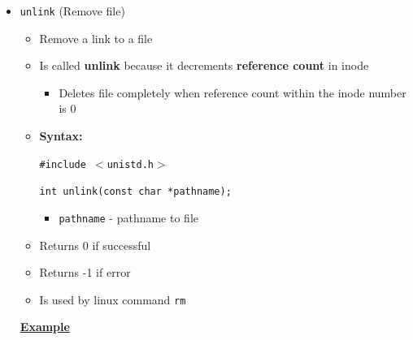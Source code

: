 \documentclass[12pt]{article}
\begin{document}
\begin{enumerate}[1.]
\begin{enumerate}
\begin{itemize}
            \item \texttt{unlink} (Remove file)

            \begin{itemize}
                \item Remove a link to a file
                \item Is called \textbf{unlink} because it decrements \textbf{reference count} in inode
                \begin{itemize}
                    \item Deletes file completely when reference count within the inode number is 0
                \end{itemize}
                \item \textbf{Syntax:}

                \bigskip
                \texttt{\#include $<$unistd.h$>$}

                \bigskip

                \texttt{int unlink(const char *pathname);}

                \bigskip

                \begin{itemize}
                    \item \texttt{pathname} - pathname to file
                \end{itemize}
                \item Returns 0 if successful
                \item Returns -1 if error
                \item Is used by linux command \texttt{rm}
            \end{itemize}

            \bigskip

            \underline{\textbf{Example}}


\end{itemize}
\end{enumerate}
\end{enumerate}
\end{document}
